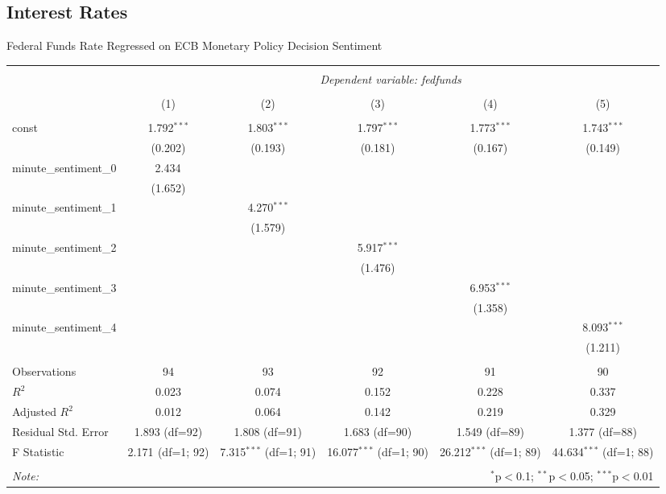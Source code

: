 \documentclass[12pt, letterpaper]{article}
\begin{document}
\subsection{Interest Rates}

Federal Funds Rate Regressed on ECB Monetary Policy Decision Sentiment

\begin{table}[H] 
\begin{adjustbox}{width=\textwidth}
\centering
\begin{tabular}{@{\extracolsep{5pt}}lccccc}
\\[-1.8ex]\hline
\hline \\[-1.8ex]
& \multicolumn{5}{c}{\textit{Dependent variable: fedfunds}} \\
\cline{2-6}
\\[-1.8ex] & (1) & (2) & (3) & (4) & (5) \\
\hline \\[-1.8ex]
const & 1.792$^{***}$ & 1.803$^{***}$ & 1.797$^{***}$ & 1.773$^{***}$ & 1.743$^{***}$ \\
& (0.202) & (0.193) & (0.181) & (0.167) & (0.149) \\
minute\_sentiment\_0 & 2.434$^{}$ & & & & \\
& (1.652) & & & & \\
minute\_sentiment\_1 & & 4.270$^{***}$ & & & \\
& & (1.579) & & & \\
minute\_sentiment\_2 & & & 5.917$^{***}$ & & \\
& & & (1.476) & & \\
minute\_sentiment\_3 & & & & 6.953$^{***}$ & \\
& & & & (1.358) & \\
minute\_sentiment\_4 & & & & & 8.093$^{***}$ \\
& & & & & (1.211) \\
\hline \\[-1.8ex]
Observations & 94 & 93 & 92 & 91 & 90 \\
$R^2$ & 0.023 & 0.074 & 0.152 & 0.228 & 0.337 \\
Adjusted $R^2$ & 0.012 & 0.064 & 0.142 & 0.219 & 0.329 \\
Residual Std. Error & 1.893 (df=92) & 1.808 (df=91) & 1.683 (df=90) & 1.549 (df=89) & 1.377 (df=88) \\
F Statistic & 2.171$^{}$ (df=1; 92) & 7.315$^{***}$ (df=1; 91) & 16.077$^{***}$ (df=1; 90) & 26.212$^{***}$ (df=1; 89) & 44.634$^{***}$ (df=1; 88) \\
\hline
\hline \\[-1.8ex]
\textit{Note:} & \multicolumn{5}{r}{$^{*}$p$<$0.1; $^{**}$p$<$0.05; $^{***}$p$<$0.01} \\
\end{tabular}
\end{adjustbox}
\end{table}
\end{document}
